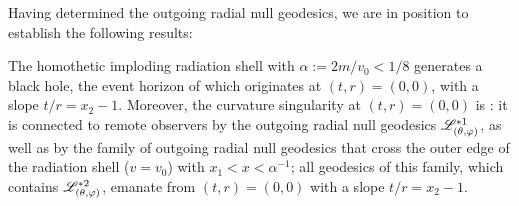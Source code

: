 Having determined the outgoing radial null geodesics, we are in position to establish
the following results:
\begin{greybox}
The homothetic imploding radiation shell with $\alpha := 2m/v_0 < 1/8$
generates a black hole, the event horizon of which originates
at $(t,r) = (0, 0)$, with a slope $t/r = x_2 - 1$. Moreover, the curvature singularity at $(t,r)=(0,0)$
is : it is connected to remote observers
by the outgoing radial null geodesics $\mathscr{L}^{*1}_{(\theta,\varphi)}$, as well as
by the family of outgoing radial
null geodesics that cross the outer edge of the radiation shell ($v=v_0$) with
$x_1 < x < \alpha^{-1}$; all geodesics of this family, which contains
$\mathscr{L}^{*2}_{(\theta,\varphi)}$, emanate from $(t,r)=(0,0)$ with a slope $t/r = x_2 - 1$.
\end{greybox}
